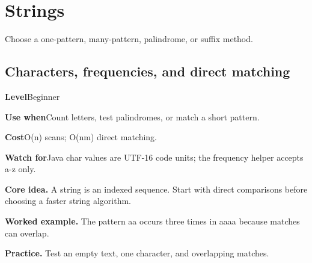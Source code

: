 \documentclass[10pt,letterpaper]{article}
\newcommand{\entrylabel}[1]{\textcolor{accent}{\bfseries #1}}
\begin{document}
\section{Strings}
\begin{guidebox}Choose a one-pattern, many-pattern, palindrome, or suffix method.\end{guidebox}
\subsection{Characters, frequencies, and direct matching}
\begin{guidebox}\small
\entrylabel{Level}\quad Beginner\par
\entrylabel{Use when}\quad Count letters, test palindromes, or match a short pattern.\par
\entrylabel{Cost}\quad O(n) scans; O(nm) direct matching.\par
\entrylabel{Watch for}\quad Java char values are UTF-16 code units; the frequency helper accepts a-z only.\par
\end{guidebox}
\noindent\textbf{Core idea.} A string is an indexed sequence. Start with direct comparisons before choosing a faster string algorithm.\par
\noindent\textbf{Worked example.} The pattern aa occurs three times in aaaa because matches can overlap.\par
\noindent\textbf{Practice.} Test an empty text, one character, and overlapping matches.\par
\end{document}
